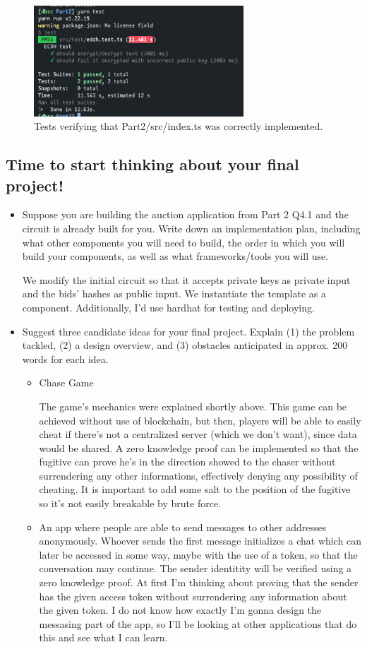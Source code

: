 \documentclass{article}
\begin{document}
\begin{figure}[h]
    \centering
    \includegraphics[width=0.7\textwidth]{test2.png}
    \caption*{Tests verifying that Part2/src/index.ts was correctly implemented.}
\end{figure}
\subsection*{Time to start thinking about your final project!}
\begin{itemize}
    \item Suppose you are building the auction application from Part 2 Q4.1 and the circuit is already built for you. Write down an implementation plan, including what other components you will need to build, the order in which you will build your components, as well as what frameworks/tools you will use. \par We modify the initial circuit so that it accepts private keys as private input and the bids' hashes as public input. We instantiate the template as a component. Additionally, I'd use hardhat for testing and deploying.
    \item Suggest three candidate ideas for your final project. Explain (1) the problem tackled, (2) a design overview, and (3) obstacles anticipated in approx. 200 words for each idea. \begin{itemize}
    \item Chase Game \par The game's mechanics were explained shortly above. This game can be achieved without use of blockchain, but then, players will be able to easily cheat if there's not a centralized server (which we don't want), since data would be shared. A zero knowledge proof can be implemented so that the fugitive can prove he's in the direction showed to the chaser without surrendering any other informations, effectively denying any possibility of cheating. It is important to add some salt to the position of the fugitive so it's not easily breakable by brute force.
    \item An app where people are able to send messages to other addresses anonymously. Whoever sends the first message initializes a chat which can later be accessed in some way, maybe with the use of a token, so that the conversation may continue. The sender identitity will be verified using a zero knowledge proof. At first I'm thinking about proving that the sender has the given access token without surrendering any information about the given token. I do not know how exactly I'm gonna design the messasing part of the app, so I'll be looking at other applications that do this and see what I can learn.
    \end{itemize}
\end{itemize}
\end{document}
